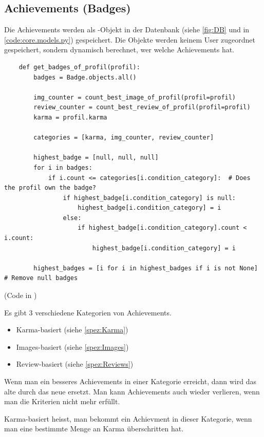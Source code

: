 \subsection{Achievements (Badges)} \label{spez:Badges}

Die Achievements werden als -Objekt in der Datenbank (siehe \ref{fig:DB} und in
\ref{code:core.models.py}) gespeichert. Die Objekte werden keinem User
zugeordnet gespeichert, sondern dynamisch berechnet, wer welche Achievements
hat.

\begin{lstlisting}
    def get_badges_of_profil(profil):
        badges = Badge.objects.all()

        img_counter = count_best_image_of_profil(profil=profil)
        review_counter = count_best_review_of_profil(profil=profil)
        karma = profil.karma

        categories = [karma, img_counter, review_counter]

        highest_badge = [null, null, null]
        for i in badges:
            if i.count <= categories[i.condition_category]:  # Does the profil own the badge?
                if highest_badge[i.condition_category] is null:
                    highest_badge[i.condition_category] = i
                else:
                    if highest_badge[i.condition_category].count < i.count:
                        highest_badge[i.condition_category] = i
        
        highest_badges = [i for i in highest_badges if i is not None]  # Remove null badges
\end{lstlisting}

(Code in )



Es gibt 3 verschiedene Kategorien von Achievements.
\begin{itemize}
    \item Karma-basiert (siehe \ref{spez:Karma})
    \item Images-basiert (siehe \ref{spez:Images})
    \item Review-basiert (siehe \ref{spez:Reviews})
\end{itemize}

Wenn man ein besseres Achievements in einer Kategorie erreicht, dann wird das
alte durch das neue ersetzt. Man kann Achievements auch wieder verlieren, wenn
man die Kriterien nicht mehr erfüllt.

Karma-basiert heisst, man bekommt ein Achievment in dieser Kategorie, wenn man
eine bestimmte Menge an Karma überschritten hat.

